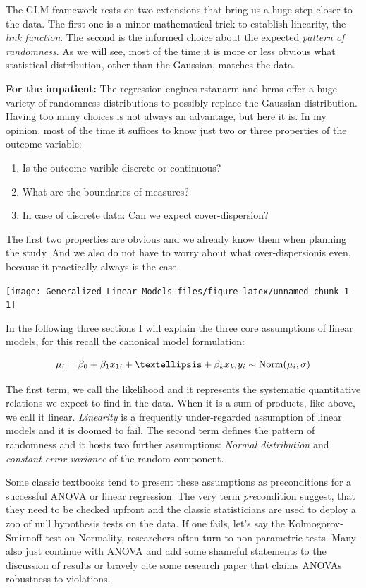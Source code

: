 \documentclass[]{svmono}
\providecommand{\tightlist}{%
  \setlength{\itemsep}{0pt}\setlength{\parskip}{0pt}}
\begin{document}
The GLM framework rests on two extensions that bring us a huge step
closer to the data. The first one is a minor mathematical trick to
establish linearity, the \emph{link function}. The second is the
informed choice about the expected \emph{pattern of randomness}. As we
will see, most of the time it is more or less obvious what statistical
distribution, other than the Gaussian, matches the data.

\textbf{For the impatient:} The regression engines rstanarm and brms
offer a huge variety of randomness distributions to possibly replace the
Gaussian distribution. Having too many choices is not always an
advantage, but here it is. In my opinion, most of the time it suffices
to know just two or three properties of the outcome variable:

\begin{enumerate}
\def\labelenumi{\arabic{enumi}.}
\tightlist
\item
  Is the outcome varible discrete or continuous?
\item
  What are the boundaries of measures?
\item
  In case of discrete data: Can we expect cover-dispersion?
\end{enumerate}

The first two properties are obvious and we already know them when
planning the study. And we also do not have to worry about what
over-dispersionis even, because it practically always is the case.

\texttt{[image: Generalized\_Linear\_Models\_files/figure-latex/unnamed-chunk-1-1]}

In the following three sections I will explain the three core
assumptions of linear models, for this recall the canonical model
formulation:

\[
\mu_i=\beta_0+ \beta_1 x_{1i}+ …+\beta_k x_{ki}\\
y_i \sim \textrm{Norm}(\mu_i,\sigma)
\]

The first term, we call the likelihood and it represents the systematic
quantitative relations we expect to find in the data. When it is a sum
of products, like above, we call it linear. \emph{Linearity} is a
frequently under-regarded assumption of linear models and it is doomed
to fail. The second term defines the pattern of randomness and it hosts
two further assumptions: \emph{Normal distribution} and \emph{constant
error variance} of the random component.

Some classic textbooks tend to present these assumptions as
preconditions for a successful ANOVA or linear regression. The very term
\emph{pre}condition suggest, that they need to be checked upfront and
the classic statisticians are used to deploy a zoo of null hypothesis
tests on the data. If one fails, let's say the Kolmogorov-Smirnoff test
on Normality, researchers often turn to non-parametric tests. Many also
just continue with ANOVA and add some shameful statements to the
discussion of results or bravely cite some research paper that claims
ANOVAs robustness to violations.
\end{document}
